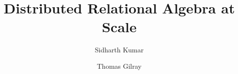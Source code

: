 \documentclass[sigconf,review, anonymous]{acmart}
\begin{document}
%
\title{Distributed Relational Algebra at Scale}

%
\author{Sidharth Kumar}
\orcid{}
\author{Thomas Gilray}
\authornotemark[1]

\newenvironment{tightenumerate}{
	\edef\backupindent{\the\parindent}
	\begin{enumerate}
		\setlength{\itemsep}{1pt}
		\setlength{\parskip}{0pt}
		\setlength{\parsep}{0pt}
		\setlength{\parindent}{\backupindent}
	}{\end{enumerate}
}
\newenvironment{tightitemize}{
	\edef\backupindent{\the\parindent}
	\begin{itemize}
		\setlength{\itemsep}{1pt}
		\setlength{\parskip}{0pt}
		\setlength{\parsep}{0pt}
		\setlength{\parindent}{\backupindent}
	}{\end{itemize}
}


%
\renewcommand{\shortauthors}{Kumar and Gilray}
\end{document}
